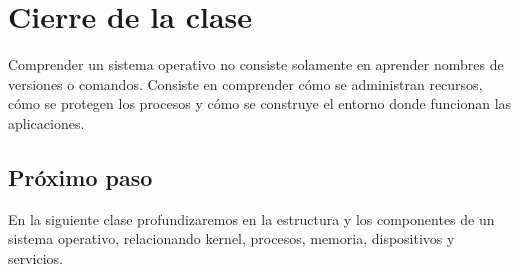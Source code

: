 \documentclass[
  spanish,
  letterpaper,
]{scrbook}
\begin{document}

\chapter{Cierre de la clase}\label{cierre-de-la-clase-1}

\begin{tcolorbox}[enhanced jigsaw, arc=.35mm, bottomrule=.15mm, bottomtitle=1mm, breakable, colback=white, colbacktitle=quarto-callout-tip-color!10!white, colframe=quarto-callout-tip-color-frame, coltitle=black, left=2mm, leftrule=.75mm, opacityback=0, opacitybacktitle=0.6, rightrule=.15mm, title=\textcolor{quarto-callout-tip-color}{\faLightbulb}\hspace{0.5em}{Consejo final del Ingeniero}, titlerule=0mm, toprule=.15mm, toptitle=1mm]

Comprender un sistema operativo no consiste solamente en aprender
nombres de versiones o comandos. Consiste en comprender cómo se
administran recursos, cómo se protegen los procesos y cómo se construye
el entorno donde funcionan las aplicaciones.

\end{tcolorbox}

\section{Próximo paso}\label{pruxf3ximo-paso}

En la siguiente clase profundizaremos en la estructura y los componentes
de un sistema operativo, relacionando kernel, procesos, memoria,
dispositivos y servicios.


\backmatter
\end{document}
